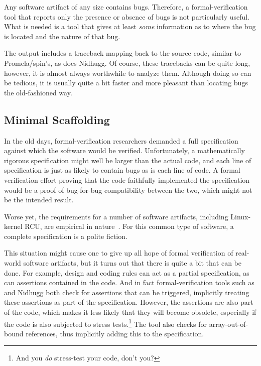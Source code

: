 Any software artifact of any size contains bugs.
Therefore, a formal-verification tool that reports only the
presence or absence of bugs is not particularly useful.
What is needed is a tool that gives at least \emph{some} information
as to where the bug is located and the nature of that bug.

The  output includes a traceback mapping back to the source
code, similar to Promela/spin's, as does Nidhugg.
Of course, these tracebacks can be quite long, however, it is almost
always worthwhile to analyze them.
Although doing so can be tedious, it is usually quite a bit faster
and more pleasant than locating bugs the old-fashioned way.
\fi

\subsection{Minimal Scaffolding}
\label{sec:formal:Minimal Scaffolding}

In the old days, formal-verification researchers demanded a full
specification against which the software would be verified.
Unfortunately, a mathematically rigorous specification might well
be larger than the actual code, and each line of specification
is just as likely to contain bugs as is each line of code.
A formal verification effort proving that the code faithfully
implemented the specification would be a proof of bug-for-bug
compatibility between the two, which might not be the intended
result.

Worse yet, the requirements for a number of software artifacts,
including Linux-kernel RCU, are empirical in
nature~\cite{PaulEMcKenney2015RCUreqts1,PaulEMcKenney2015RCUreqts2,PaulEMcKenney2015RCUreqts3}.
For this common type of software, a complete specification is a
polite fiction.

This situation might cause one to give up all hope of formal verification
of real-world software artifacts, but it turns out that there is
quite a bit that can be done.
For example, design and coding rules can act as a partial specification,
as can assertions contained in the code.
And in fact formal-verification tools such as  and Nidhugg
both check for assertions that can be triggered, implicitly treating
these assertions as part of the specification.
However, the assertions are also part of the code, which makes it less
likely that they will become obsolete, especially if the code is
also subjected to stress tests.\footnote{
	And you \emph{do} stress-test your code, don't you?}
The  tool also checks for array-out-of-bound references,
thus implicitly adding this to the specification.

